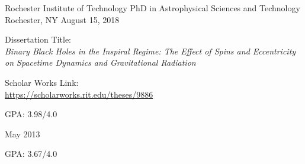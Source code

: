 \begin{cventries}
 \cventry
    {Rochester Institute of Technology}
    {PhD in Astrophysical Sciences and Technology}
    {Rochester, NY}
    {August 15, 2018}
    {
      \begin{cvitems}
       \item {Dissertation Title: \\
       \textit{Binary Black Holes in the Inspiral Regime:
       The Effect of Spins and Eccentricity on Spacetime Dynamics and Gravitational Radiation}}
       \item {Scholar Works Link: \\
       \url{https://scholarworks.rit.edu/theses/9886}}
       \item {GPA: 3.98/4.0}
      \end{cvitems}
   }

  \cventry
    {}
    {}
    {}
    {May 2013}
    {
      \begin{cvitems}
        \item {}
        \item {GPA: 3.67/4.0}
      \end{cvitems}
   }

\end{cventries}
